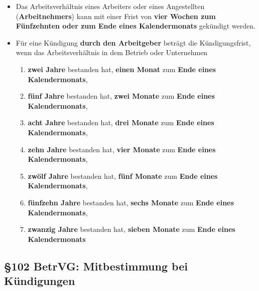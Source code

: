 \documentclass[a4paper, 12pt]{report}
\begin{document}
\begin{multicols}{2}
\begin{itemize}
    \item[(1)] Das Arbeitsverhältnis eines Arbeiters oder eines Angestellten
	(\textbf{Arbeitnehmers}) kann mit einer Frist von \textbf{vier Wochen
	zum Fünfzehnten oder zum Ende eines Kalendermonats} gekündigt werden.
    \item[(2)] Für eine Kündigung \textbf{durch den Arbeitgeber} beträgt die
	Kündigungsfrist, wenn das Arbeitsverhältnis in dem Betrieb oder
	Unternehmen
	\begin{enumerate}
	    \item \textbf{zwei Jahre} bestanden hat, \textbf{einen Monat} zum
		\textbf{Ende eines Kalendermonats},
	    \item \textbf{fünf Jahre} bestanden hat, \textbf{zwei Monate} zum
		\textbf{Ende eines Kalendermonats},
	    \item \textbf{acht Jahre} bestanden hat, \textbf{drei Monate} zum
		\textbf{Ende eines Kalendermonats},
	    \item \textbf{zehn Jahre} bestanden hat, \textbf{vier Monate} zum
		\textbf{Ende eines Kalendermonats},
	    \item \textbf{zwölf Jahre} bestanden hat, \textbf{fünf Monate} zum
		\textbf{Ende eines Kalendermonats},
	    \item \textbf{fünfzehn Jahre} bestanden hat, \textbf{sechs Monate}
		zum \textbf{Ende eines Kalendermonats},
	    \item \textbf{zwanzig Jahre} bestanden hat, \textbf{sieben Monate}
		zum \textbf{Ende eines Kalendermonats}
	\end{enumerate}
\end{itemize}

\subsection{\S 102 BetrVG: Mitbestimmung bei Kündigungen}


\end{multicols}
\end{document}
